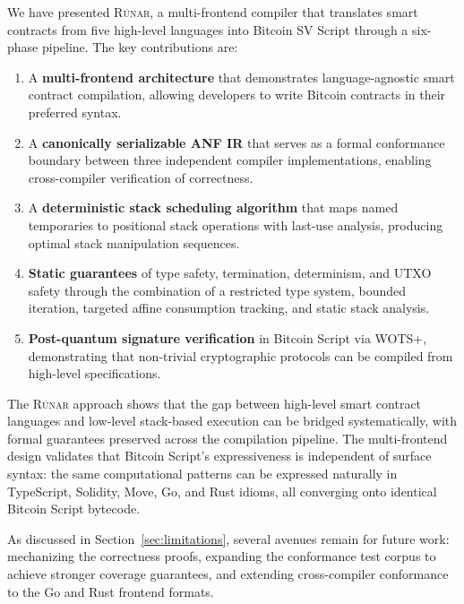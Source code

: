 \documentclass[11pt,a4paper]{article}
\newcommand{\runar}{\textsc{Rúnar}}
\begin{document}
We have presented \runar{}, a multi-frontend compiler that translates smart
contracts from five high-level languages into Bitcoin SV Script through a
six-phase pipeline. The key contributions are:

\begin{enumerate}[label=(\roman*)]
  \item A \textbf{multi-frontend architecture} that demonstrates
    language-agnostic smart contract compilation, allowing developers to
    write Bitcoin contracts in their preferred syntax.
  \item A \textbf{canonically serializable ANF IR} that serves as a formal
    conformance boundary between three independent compiler implementations,
    enabling cross-compiler verification of correctness.
  \item A \textbf{deterministic stack scheduling algorithm} that maps named
    temporaries to positional stack operations with last-use analysis,
    producing optimal stack manipulation sequences.
  \item \textbf{Static guarantees} of type safety, termination, determinism,
    and UTXO safety through the combination of a restricted type system,
    bounded iteration, targeted affine consumption tracking, and static
    stack analysis.
  \item \textbf{Post-quantum signature verification} in Bitcoin Script
    via WOTS+, demonstrating that non-trivial cryptographic protocols can
    be compiled from high-level specifications.
\end{enumerate}

The \runar{} approach shows that the gap between high-level smart contract
languages and low-level stack-based execution can be bridged systematically,
with formal guarantees preserved across the compilation pipeline. The
multi-frontend design validates that Bitcoin Script's expressiveness is
independent of surface syntax: the same computational patterns can be
expressed naturally in TypeScript, Solidity, Move, Go, and Rust idioms,
all converging onto identical Bitcoin Script bytecode.

As discussed in Section~\ref{sec:limitations}, several avenues remain for
future work: mechanizing the correctness proofs, expanding the conformance
test corpus to achieve stronger coverage guarantees, and extending
cross-compiler conformance to the Go and Rust frontend formats.

\end{document}
